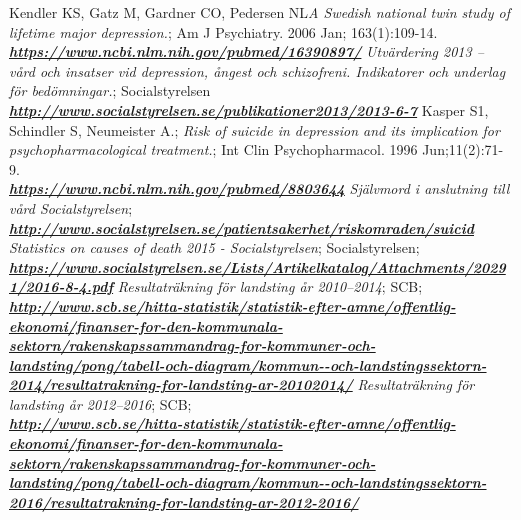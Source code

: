 \documentclass[12pt,a4paper,oneside]{article}
\begin{document}
\begin{thebibliography}{11}
Kendler KS, Gatz M, Gardner CO, Pedersen NL\emph{A Swedish national twin study of lifetime major depression.}; Am J Psychiatry. 2006 Jan; 163(1):109-14.\\\textbf{\emph{\href{https://www.ncbi.nlm.nih.gov/pubmed/16390897/}{\url{https://www.ncbi.nlm.nih.gov/pubmed/16390897/}}}}
 \emph{Utv{\"a}rdering 2013 -- v\r{a}rd och insatser vid depression, \r{a}ngest och schizofreni. Indikatorer och underlag f{\"o}r bed{\"o}mningar.}; Socialstyrelsen\\\textbf{\emph{\href{http://www.socialstyrelsen.se/publikationer2013/2013-6-7}{\url{http://www.socialstyrelsen.se/publikationer2013/2013-6-7}}}}
 Kasper S1, Schindler S, Neumeister A.; \emph{Risk of suicide in depression and its implication for psychopharmacological treatment.}; Int Clin Psychopharmacol. 1996 Jun;11(2):71-9.\\\textbf{\emph{\href{https://www.ncbi.nlm.nih.gov/pubmed/8803644}{\url{https://www.ncbi.nlm.nih.gov/pubmed/8803644}}}}
 \emph{Sj{\"a}lvmord i anslutning till v\r{a}rd Socialstyrelsen};\\\textbf{\emph{\href{http://www.socialstyrelsen.se/patientsakerhet/riskomraden/suicid}{\url{http://www.socialstyrelsen.se/patientsakerhet/riskomraden/suicid
}}}}
\emph{Statistics on causes of death 2015 - Socialstyrelsen}; Socialstyrelsen;
\\\textbf{\emph{\href{https://www.socialstyrelsen.se/Lists/Artikelkatalog/Attachments/20291/2016-8-4.pdf}{\url{
https://www.socialstyrelsen.se/Lists/Artikelkatalog/Attachments/20291/2016-8-4.pdf}}}}
 \emph{Resultatr{\"a}kning f{\"o}r landsting \r{a}r 2010--2014}; SCB;\\\textbf{\emph{\href{ http://www.scb.se/hitta-statistik/statistik-efter-amne/offentlig-ekonomi/finanser-for-den-kommunala-sektorn/rakenskapssammandrag-for-kommuner-och-landsting/pong/tabell-och-diagram/kommun--och-landstingssektorn-2014/resultatrakning-for-landsting-ar-20102014/}{\url{http://www.scb.se/hitta-statistik/statistik-efter-amne/offentlig-ekonomi/finanser-for-den-kommunala-sektorn/rakenskapssammandrag-for-kommuner-och-landsting/pong/tabell-och-diagram/kommun--och-landstingssektorn-2014/resultatrakning-for-landsting-ar-20102014/}}}}
 \emph{Resultatr{\"a}kning f{\"o}r landsting \r{a}r 2012--2016}; SCB;\\\textbf{\emph{\href{
http://www.scb.se/hitta-statistik/statistik-efter-amne/offentlig-ekonomi/finanser-for-den-kommunala-sektorn/rakenskapssammandrag-for-kommuner-och-landsting/pong/tabell-och-diagram/kommun--och-landstingssektorn-2016/resultatrakning-for-landsting-ar-2012-2016/}{\url{http://www.scb.se/hitta-statistik/statistik-efter-amne/offentlig-ekonomi/finanser-for-den-kommunala-sektorn/rakenskapssammandrag-for-kommuner-och-landsting/pong/tabell-och-diagram/kommun--och-landstingssektorn-2016/resultatrakning-for-landsting-ar-2012-2016/}}}}

\end{thebibliography}
\end{document}
